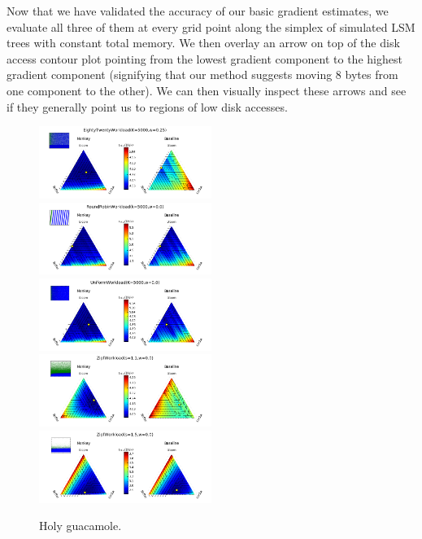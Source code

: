 \documentclass{sig-alternate-05-2015}
\begin{document}
Now that we have validated the accuracy of our basic gradient estimates, we
evaluate all three of them at every grid point along the simplex of simulated
LSM trees with constant total memory. We then overlay an arrow on top of the
disk access contour plot pointing from the lowest gradient component to the
highest gradient component (signifying that our method suggests moving 8 bytes
from one component to the other). We can then visually inspect these arrows and
see if they generally point us to regions of low disk accesses.

\begin{figure}[!htb]
\begin{center}
\includegraphics[width=0.5\textwidth]{eightwenquiv1.png}
\includegraphics[width=0.5\textwidth]{robinquiv1.png}
\includegraphics[width=0.5\textwidth]{uniformquiv1.png}
\includegraphics[width=0.5\textwidth]{zipfquiv1.png}
\includegraphics[width=0.5\textwidth]{zipfquiv2.png}
\end{center}
\caption{Holy guacamole.}
\label{fig:basicquiv}
\end{figure}
\end{document}
